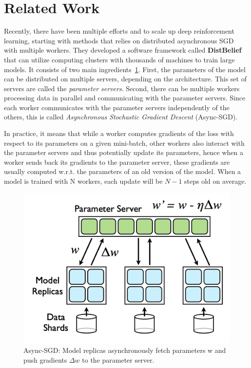 \clearpage

\section{Related Work}

Recently, there have been multiple efforts and to scale up deep reinforcement learning, starting with methods that relies on distributed asynchronous SGD~\parencite{dean2012large} with multiple workers. They developed a software framework
called \textbf{DistBelief} that can utilize computing clusters with thousands of machines to train large models. It consists of two main ingredients~\ref{fig:sgd}. First, the parameters of the model can be distributed on multiple servers, depending on the architecture. This set of servers are called the \textit{parameter
servers}. Second, there can be multiple workers processing data in parallel and communicating with the parameter servers. Since each worker communicates with the parameter servers independently of the others, this is
called \textit{Asynchronous Stochastic Gradient Descent} (Async-SGD).

In practice, it means that while a worker computes gradients of the loss with respect to its parameters on a given mini-batch, other workers also interact with the parameter servers and thus potentially update its parameters, hence when a worker sends back its gradients to the parameter server, these gradients are usually computed w.r.t. the parameters of an old version of the model. When a model is trained with N workers, each update will be $N-1$ steps old on average.

\begin{figure}[H]
    \centering
    \includegraphics[width=0.7\linewidth]{figures/algos/sgd.png}
    \caption{Async-SGD: Model replicas asynchronously fetch parameters w and push gradients \(\Delta w\) to the parameter server.}
    \label{fig:sgd}
\end{figure}

